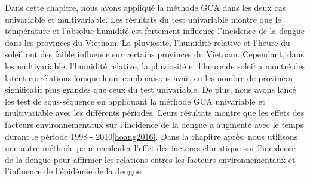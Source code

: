 Dans cette chapitre, nous avons appliqué la méthode GCA dans les deux cas univariable  et multivariable. Les résultats du test univariable montre que le température et l'absolue humidité est fortement influence l'incidence de la dengue dans les provinces du Vietnam. La pluviosité, l'humidité relative et l'heure du soleil ont des faible influence sur certains provinces du Vietnam. Cependant, dans les multivariable, l'humidité relative, la pluviosité et l'heure de soleil a montré des latent corrélations lorsque leurs combinaisons avait eu les nombre de provinces significatif plus grandes que ceux du test univariable. De plus, nous avons lancé les test de sous-séquence en appliquant la méthode GCA univariable et multivariable avec les différents périodes. Leurs résultats montre que les effets des facteurs environnementaux sur l'incidence de la dengue a augmenté avec le temps durant le période 1998 - 2010\ref{hoang2016}. Dans la chapitre après, nous utilisons une autre méthode pour recalculer l'effet des facteurs climatique sur l'incidence de la dengue pour affirmer les relations entres les facteurs environnementaux et l'influence de l'épidémie de la dengue.






